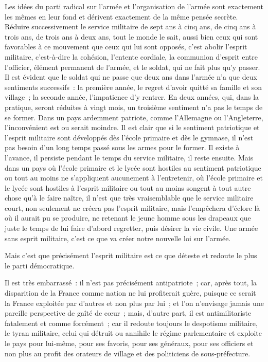 \documentclass[french,twoside]{book} %
\begin{document}
Les idées du parti radical sur l’armée et l’organisation de l’armée sont exactement les mêmes en leur fond et dérivent exactement de la même pensée secrète. Réduire successivement le service militaire de sept ans à cinq ans, de cinq ans à trois ans, de trois ans à deux ans, tout le monde le sait, aussi bien ceux qui sont favorables à ce mouvement que ceux qui lui sont opposés, c’est abolir l’esprit militaire, c’est-à-dire la cohésion, l’entente cordiale, la communion d’esprit entre l’officier, élément permanent de l’armée, et le soldat, qui ne fait plus qu’y passer. Il est évident que le soldat qui ne passe que deux ans dans l’armée n’a que deux sentiments successifs : la première année, le regret d’avoir quitté sa famille et son village ; la seconde année, l’impatience d’y rentrer. En deux années, qui, dans la pratique, seront réduites à vingt mois, un troisième sentiment n’a pas le temps de se former. Dans un pays ardemment patriote, comme l’Allemagne ou l’Angleterre, l’inconvénient est ou serait moindre. Il est clair que si le sentiment patriotique et l’esprit militaire sont développés dès l’école primaire et dès le gymnase, il n’est  pas besoin d’un long temps passé sous les armes pour le former. Il existe à l’avance, il persiste pendant le temps du service militaire, il reste ensuite. Mais dans un pays où l’école primaire et le lycée sont hostiles au sentiment patriotique ou tout au moins ne s’appliquent aucunement à l’entretenir, où l’école primaire et le lycée sont hostiles à l’esprit militaire ou tout au moins songent à tout autre chose qu’à le faire naître, il n’est que très vraisemblable que le service militaire court, non seulement ne créera pas l’esprit militaire, mais l’empêchera d’éclore là où il aurait pu se produire, ne retenant le jeune homme sous les drapeaux que juste le temps de lui faire d’abord regretter, puis désirer la vie civile. Une armée sans esprit militaire, c’est ce que va créer notre nouvelle loi sur l’armée.\par
Mais c’est que précisément l’esprit militaire est ce que déteste et redoute le plus le parti démocratique.\par
Il est très embarrassé : il n’est pas précisément antipatriote ; car, après tout, la disparition de la France comme nation ne lui profiterait guère, puisque ce serait la France exploitée par d’autres et non plus par lui ; et l’on n’envisage jamais une pareille perspective de gaîté de cœur ; mais, d’autre part, il est antimilitariste fatalement et comme  forcément ; car il redoute toujours le despotisme militaire, le tyran militaire, celui qui détruit ou annihile le régime parlementaire et exploite le pays pour lui-même, pour ses favoris, pour ses généraux, pour ses officiers et non plus au profit des orateurs de village et des politiciens de sous-préfecture.\par
\end{document}
